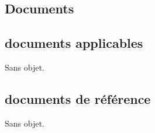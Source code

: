 \textcolor[RGB]{46, 116, 181}{\chapter{Documents}}
\section{documents applicables}
Sans objet.
\section{documents de référence}
Sans objet.
